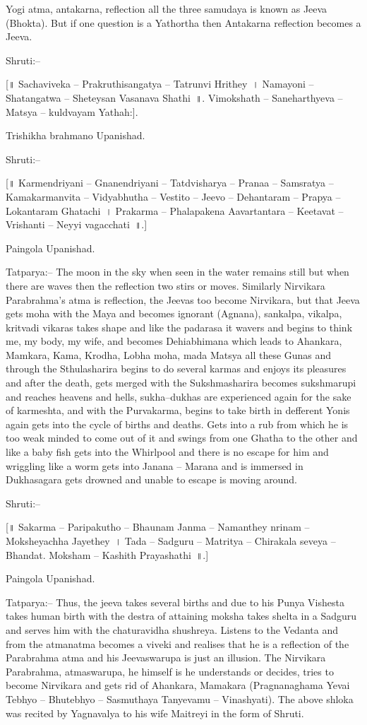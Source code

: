 Yogi atma, antakarna, reflection all the three samudaya is known as Jeeva (Bhokta). But if one question is a Yathortha then Antakarna reflection becomes a Jeeva.

Shruti:–

[॥ Sachaviveka – Prakruthisangatya – Tatrunvi Hrithey~। Namayoni – Shatangatwa – Sheteysan Vasanava Shathi~॥. Vimokshath – Saneharthyeva – Matsya – kuldvayam Yathah:].

Trishikha brahmano Upanishad.

Shruti:–

[॥ Karmendriyani – Gnanendriyani – Tatdvisharya – Pranaa – Samsratya – Kamakarmanvita – Vidyabhutha – Vestito – Jeevo – Dehantaram – Prapya – Lokantaram Ghatachi~। Prakarma – Phalapakena Aavartantara – Keetavat – Vrishanti – Neyyi vagacchati~॥.]

Paingola Upanishad.

Tatparya:– The moon in the sky when seen in the water remains still but when there are waves then the reflection two stirs or moves. Similarly Nirvikara Parabrahma's atma is reflection, the Jeevas too become Nirvikara, but that Jeeva gets moha with the Maya and becomes ignorant (Agnana), sankalpa, vikalpa, kritvadi vikaras takes shape and like the padarasa it wavers and begins to think me, my body, my wife, and becomes Dehiabhimana which leads to Ahankara, Mamkara, Kama, Krodha, Lobha moha, mada Matsya all these Gunas and through the Sthulasharira begins to do several karmas and enjoys its pleasures and after the death, gets merged with the Sukshmasharira becomes sukshmarupi and reaches heavens and hells, sukha–dukhas are experienced again for the sake of karmeshta, and with the Purvakarma, begins to take birth in defferent Yonis again gets into the cycle of births and deaths. Gets into a rub from which he is too weak minded to come out of it and swings from one Ghatha to the other and like a baby fish gets into the Whirlpool and there is no escape for him and wriggling like a worm gets into Janana – Marana and is immersed in Dukhasagara gets drowned and unable to escape is moving around.

Shruti:–

[॥ Sakarma – Paripakutho – Bhaunam Janma – Namanthey nrinam – Moksheyachha Jayethey~। Tada – Sadguru – Matritya – Chirakala seveya – Bhandat. Moksham – Kashith Prayashathi~॥.]

Paingola Upanishad.

Tatparya:– Thus, the jeeva takes several births and due to his Punya Vishesta takes human birth with the destra of attaining moksha takes shelta in a Sadguru and serves him with the chaturavidha shushreya. Listens to the Vedanta and from the atmanatma becomes a viveki and realises that he is a reflection of the Parabrahma atma and his Jeevaswarupa is just an illusion. The Nirvikara Parabrahma, atmaswarupa, he himself is he understands or decides, tries to become Nirvikara and gets rid of Ahankara, Mamakara (Pragnanaghama Yevai Tebhyo – Bhutebhyo – Sasmuthaya Tanyevamu – Vinashyati). The above shloka was recited by Yagnavalya to his wife Maitreyi in the form of Shruti.

